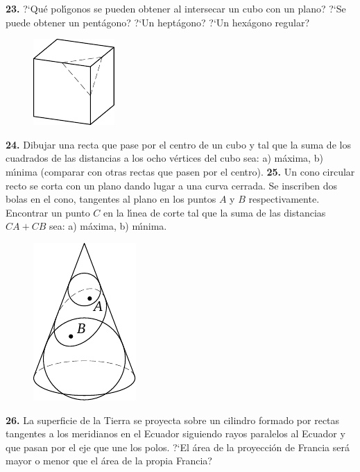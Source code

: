 \documentclass[12pt, spanish]{article}  %
\begin{document}
\newpage
\noindent
{\bf 23.} ?`Qu\'e pol\'{\i}gonos se pueden obtener al intersecar un cubo con un plano? ?`Se puede obtener un pent\'agono? ?`Un hept\'agono? 
?`Un hex\'agono regular?
\begin{figure}[h]
\centering
\footnotesize
\includegraphics[scale=1]{taskbook-7}
\end{figure}
\newline\newline\quad
{\bf 24.} Dibujar una recta que pase por el centro de un cubo y tal que la suma de los cuadrados de las distancias a los ocho v\'ertices del cubo sea:
a) m\'axima,
\newline
b) m\'{\i}nima (comparar con otras rectas que pasen por el centro).
\newline\newline\quad
{\bf 25.} Un cono circular recto se corta con un plano dando lugar a una curva cerrada. Se inscriben dos bolas en el cono, tangentes al plano en los puntos $A$ y $B$ respectivamente. 
Encontrar un punto $C$ en la l\'{\i}nea de corte tal que la suma de las distancias $CA + CB$ sea:
 a) m\'axima, b) m\'{\i}nima.
\begin{figure}[h]
\centering
\footnotesize
\includegraphics[scale=1]{taskbook-9}
\end{figure}
\newline\newline\quad
{\bf 26.} La superficie de la Tierra se proyecta sobre un cilindro formado por rectas tangentes a los meridianos en el Ecuador siguiendo rayos paralelos al Ecuador y que pasan por el eje que une los polos.
?`El \'area de la proyecci\'on de Francia ser\'a mayor o menor que el \'area de la propia Francia?
\end{document}
